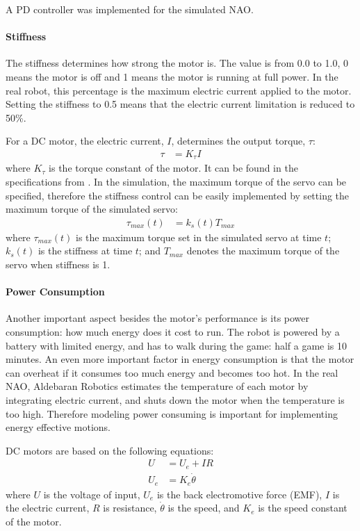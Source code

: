 \documentclass{llncs}
\begin{document}
A PD controller was implemented for the simulated NAO. 

\paragraph{Stiffness}
The stiffness determines how strong the motor is. The value is from 0.0
to 1.0, 0 means the motor is off and 1 means the motor is running at
full power. In the real robot,
this percentage is the maximum electric current applied to the motor. Setting the
stiffness to 0.5 means that the electric current limitation is reduced
to 50\%.

For a DC motor, the electric current, $I$, determines the output torque,
$\tau$:
\begin{align}
  \tau &= K_\tau I \label{eq:tau-i}
\end{align}
where $K_\tau$ is the torque constant of the motor. It can be found in the
specifications from \cite{naoqi}. In
the simulation, the maximum torque of the servo can be specified, therefore the
stiffness control can be easily implemented by setting the maximum torque
of the simulated servo:
\begin{align}
  \tau_{max}(t) &= k_{s}(t) T_{max}
\end{align}
where $\tau_{max}(t)$ is the maximum torque set in the simulated servo at
time $t$; $k_{s}(t)$ is the stiffness at time $t$; and $T_{max}$
denotes the maximum torque of the servo when stiffness is 1.

\paragraph{Power Consumption}
Another important aspect besides the motor's performance is its
power consumption: how much energy does it cost to run.
The robot is powered by a battery with limited energy, and has to walk during the
game: half a game is 10 minutes.
An even more important factor in energy consumption is
that the motor can overheat if it consumes too much energy and
becomes too hot. In the real NAO, Aldebaran Robotics estimates the temperature
of each motor by integrating electric current, and shuts down the motor
when the temperature is too high. Therefore modeling power consuming
is important for implementing energy effective motions.

DC motors are based on the following equations:
\begin{align}
  U &= U_e + IR \label{eq:u-ir}\\
  U_e &= K_e \dot{\theta} \label{eq:u-ke}
\end{align}
where $U$ is the voltage of input, $U_e$ is the back electromotive
force (EMF), $I$ is the electric current, $R$ is resistance,
$\dot{\theta}$ is the speed, and $K_e$ is the speed constant of the motor.
\end{document}
